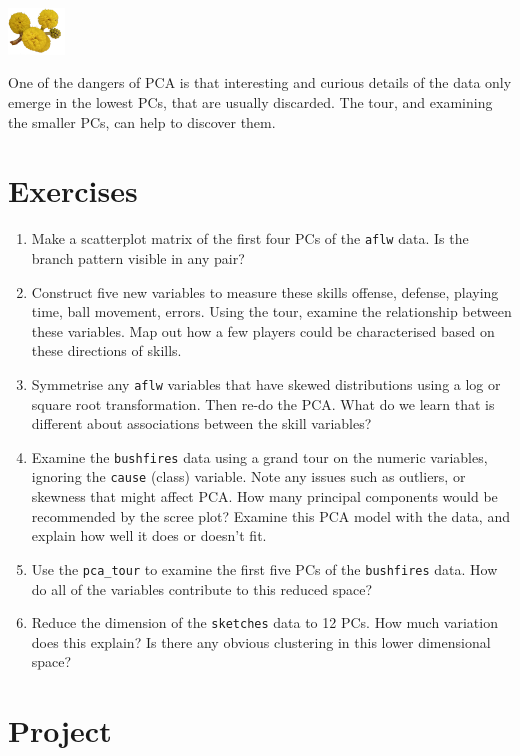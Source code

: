 \documentclass[
  letterpaper,
]{krantz}
\providecommand{\tightlist}{%
  \setlength{\itemsep}{0pt}\setlength{\parskip}{0pt}}\usepackage{longtable,booktabs,array}
\newcommand{\infobox}[1]{%
\noindent\colorbox{info!30}{%
\begin{minipage}{0.98\linewidth}%
    \centering%
    \begin{minipage}[c]{0.15\linewidth} %
      \includegraphics[width=1.5cm]{images/mulga-flowers2.png} %
    \end{minipage}%
    \hfill %
    \begin{minipage}[c]{0.8\linewidth} %
      \bigskip%
      \textsf{#1}%
      \bigskip%
    \end{minipage}%
    \hspace*{3mm}%
  \end{minipage}%
}%
}
\begin{document}
\infobox{One of the dangers of PCA is that interesting and curious details of the data only emerge in the lowest PCs, that are usually discarded. The tour, and examining the smaller PCs, can help to discover them.}

\hypertarget{exercises-3}{%
\section*{Exercises}\label{exercises-3}}


\begin{enumerate}
\def\labelenumi{\arabic{enumi}.}
\tightlist
\item
  Make a scatterplot matrix of the first four PCs of the \texttt{aflw}
  data. Is the branch pattern visible in any pair?
\item
  Construct five new variables to measure these skills offense, defense,
  playing time, ball movement, errors. Using the tour, examine the
  relationship between these variables. Map out how a few players could
  be characterised based on these directions of skills.
\item
  Symmetrise any \texttt{aflw} variables that have skewed distributions
  using a log or square root transformation. Then re-do the PCA. What do
  we learn that is different about associations between the skill
  variables?
\item
  Examine the \texttt{bushfires} data using a grand tour on the numeric
  variables, ignoring the \texttt{cause} (class) variable. Note any
  issues such as outliers, or skewness that might affect PCA. How many
  principal components would be recommended by the scree plot? Examine
  this PCA model with the data, and explain how well it does or doesn't
  fit.
\item
  Use the \texttt{pca\_tour} to examine the first five PCs of the
  \texttt{bushfires} data. How do all of the variables contribute to
  this reduced space?
\item
  Reduce the dimension of the \texttt{sketches} data to 12 PCs. How much
  variation does this explain? Is there any obvious clustering in this
  lower dimensional space?
\end{enumerate}

\hypertarget{project}{%
\section*{Project}\label{project}}
\end{document}
